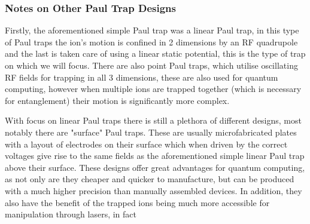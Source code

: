 \subsubsection{Notes on Other Paul Trap Designs}
Firstly, the aforementioned simple Paul trap was a linear Paul trap, in this type of Paul traps the ion's motion is confined in 2 dimensions by an RF quadrupole and the last is taken care of using a linear static potential, this is the type of trap on which we will focus.
There are also point Paul traps, which utilise oscillating RF fields for trapping in all 3 dimensions, these are also used for quantum computing, however when multiple ions are trapped together (which is necessary for entanglement) their motion is significantly more complex.

With focus on linear Paul traps there is still a plethora of different designs, most notably there are "surface" Paul traps.
These are usually microfabricated plates with a layout of electrodes on their surface which when driven by the correct voltages give rise to the same fields as the aforementioned simple linear Paul trap above their surface.
These designs offer great advantages for quantum computing, as not only are they cheaper and quicker to manufacture, but can be produced with a much higher precision than manually assembled devices.
In addition, they also have the benefit of the trapped ions being much more accessible for manipulation through lasers, in fact 




